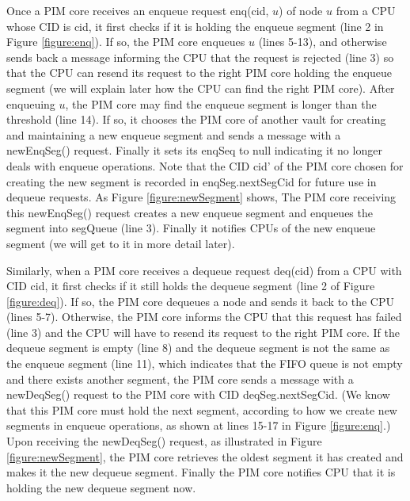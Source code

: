 \documentclass[11pt]{article}
\begin{document}
Once a PIM core receives an enqueue request enq(cid, $u$) of node $u$ from a CPU whose CID is cid,
it first checks if it is holding the enqueue segment (line 2 in Figure \ref{figure:enq}).
If so, the PIM core enqueues $u$ (lines 5-13), and otherwise sends back a message
informing the CPU that the request is rejected (line 3) so that
the CPU can resend its request to the right PIM core holding the enqueue segment
(we will explain later how the CPU can find the right PIM core).
After enqueuing $u$, the PIM core may find the enqueue segment is longer than the threshold (line 14).
If so, it chooses the PIM core of another vault for creating and maintaining a new enqueue segment 
and sends a message with a newEnqSeg() request.
Finally it sets its enqSeq to null indicating it no longer deals with enqueue operations.
Note that the CID cid' of the PIM core chosen for creating the new segment is recorded in 
enqSeg.nextSegCid for future use in dequeue requests.
As Figure \ref{figure:newSegment} shows,
The PIM core receiving this newEnqSeg() request creates a new enqueue segment and enqueues 
the segment into segQueue (line 3). 
Finally it notifies CPUs of the new enqueue segment (we will get to it in more detail later).

Similarly, when a PIM core receives a dequeue request deq(cid) from a CPU with CID cid,
it first checks if it still holds the dequeue segment (line 2 of Figure \ref{figure:deq}).
If so, the PIM core dequeues a node and sends it back to the CPU (lines 5-7).
Otherwise, the PIM core informs the CPU that this request has failed (line 3) and
the CPU will have to resend its request to the right PIM core.
If the dequeue segment is empty (line 8) and the dequeue segment is not the same as 
the enqueue segment (line 11), which indicates that the FIFO queue is not empty 
and there exists another segment, the PIM core sends a message with a newDeqSeg() request 
to the PIM core with CID deqSeg.nextSegCid. 
(We know that this PIM core must hold the next segment, 
according to how we create new segments in enqueue operations, 
as shown at lines 15-17 in Figure \ref{figure:enq}.) 
Upon receiving the newDeqSeg() request, as illustrated in Figure \ref{figure:newSegment}, 
the PIM core retrieves the oldest segment it has created and makes it the new dequeue segment.    Finally the PIM core notifies CPU that it is holding the new dequeue segment now.
\end{document}
